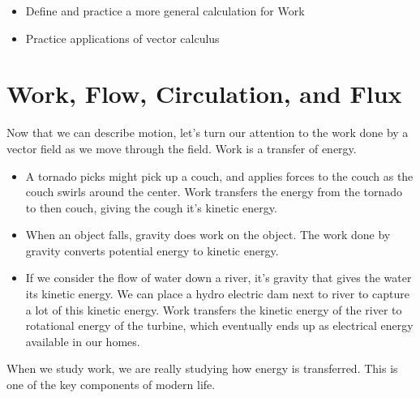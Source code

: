 
\newpage
{}
\uday
\normalsize
\begin{itemize}
\item Define and practice a more general calculation for Work
\item Practice applications of vector calculus
\end{itemize}

\section{Work, Flow, Circulation, and Flux}

Now that we can describe motion, let's turn our attention to the work done by a vector field as we move through the field. Work is a transfer of energy. 
\begin{itemize}
 \item A tornado picks might pick up a couch, and applies forces to the couch as the couch swirls around the center. Work transfers the energy from the tornado to then couch, giving the cough it's kinetic energy. 
 \item When an object falls, gravity does work on the object. The work done by gravity converts potential energy to kinetic energy. 
 \item If we consider the flow of water down a river, it's gravity that gives the water its kinetic energy. We can place a hydro electric dam next to river to capture a lot of this kinetic energy.  Work transfers the kinetic energy of the river to rotational energy of the turbine, which eventually ends up as electrical energy available in our homes.  
\end{itemize}
When we study work, we are really studying how energy is transferred. This is one of the key components of modern life.


